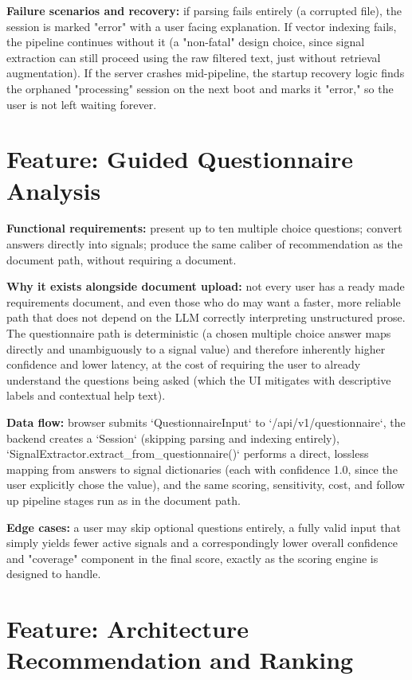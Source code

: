 \documentclass[11pt,a4paper]{report}
\begin{document}
\textbf{Failure scenarios and recovery:} if parsing fails entirely (a corrupted file), the session is marked "error" with a user facing explanation. If vector indexing fails, the pipeline continues without it (a "non-fatal" design choice, since signal extraction can still proceed using the raw filtered text, just without retrieval augmentation). If the server crashes mid-pipeline, the startup recovery logic finds the orphaned "processing" session on the next boot and marks it "error," so the user is not left waiting forever.

\section{Feature: Guided Questionnaire Analysis}

\textbf{Functional requirements:} present up to ten multiple choice questions; convert answers directly into signals; produce the same caliber of recommendation as the document path, without requiring a document.

\textbf{Why it exists alongside document upload:} not every user has a ready made requirements document, and even those who do may want a faster, more reliable path that does not depend on the LLM correctly interpreting unstructured prose. The questionnaire path is deterministic (a chosen multiple choice answer maps directly and unambiguously to a signal value) and therefore inherently higher confidence and lower latency, at the cost of requiring the user to already understand the questions being asked (which the UI mitigates with descriptive labels and contextual help text).

\textbf{Data flow:} browser submits `QuestionnaireInput` to `/api/v1/questionnaire`, the backend creates a `Session` (skipping parsing and indexing entirely), `SignalExtractor.extract_from_questionnaire()` performs a direct, lossless mapping from answers to signal dictionaries (each with confidence 1.0, since the user explicitly chose the value), and the same scoring, sensitivity, cost, and follow up pipeline stages run as in the document path.

\textbf{Edge cases:} a user may skip optional questions entirely, a fully valid input that simply yields fewer active signals and a correspondingly lower overall confidence and "coverage" component in the final score, exactly as the scoring engine is designed to handle.

\section{Feature: Architecture Recommendation and Ranking}
\end{document}
